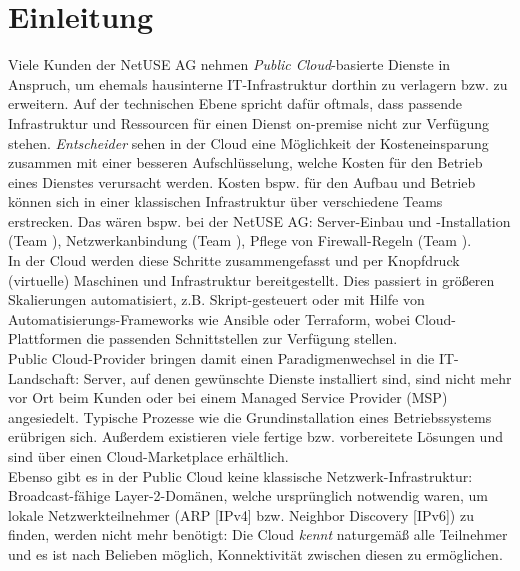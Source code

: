 \chapter{Einleitung}

Viele Kunden der NetUSE AG nehmen \textit{Public Cloud}-basierte Dienste in Anspruch, um ehemals hausinterne IT-Infrastruktur dorthin zu verlagern bzw. zu erweitern. Auf der technischen Ebene spricht dafür oftmals, dass passende Infrastruktur und Ressourcen für einen Dienst on-premise\cite{Karlstetter2017} nicht zur Verfügung stehen. \textit{Entscheider} sehen in der Cloud eine Möglichkeit der Kosteneinsparung zusammen mit einer besseren Aufschlüsselung, welche Kosten für den Betrieb eines Dienstes verursacht werden. Kosten bspw. für den Aufbau und Betrieb können sich in einer klassischen Infrastruktur über verschiedene Teams erstrecken. Das wären bspw. bei der NetUSE AG: Server-Einbau und -Installation (Team \grqq{}), Netzwerkanbindung (Team \grqq{}), Pflege von Firewall-Regeln (Team \grqq{}).\\
In der Cloud werden diese Schritte zusammengefasst und per Knopfdruck (virtuelle) Maschinen und Infrastruktur bereitgestellt\cite{Karlstetter2017a}. Dies passiert in größeren Skalierungen automatisiert, z.B. Skript-gesteuert oder mit Hilfe von Automatisierungs-Frameworks wie Ansible oder Terraform, wobei Cloud-Plattformen die passenden Schnittstellen zur Verfügung stellen\cite{edelman2018}\cite{Brikman2019}.\\
Public Cloud-Provider bringen damit einen Paradigmenwechsel in die IT-Landschaft: Server, auf denen gewünschte Dienste installiert sind, sind nicht mehr vor Ort beim Kunden oder bei einem Managed Service Provider (MSP)\cite{Laimingas2017} angesiedelt. Typische Prozesse wie die Grundinstallation eines Betriebssystems erübrigen sich. Außerdem existieren viele fertige bzw. vorbereitete Lösungen und sind über einen Cloud-Marketplace erhältlich.\\
Ebenso gibt es in der Public Cloud keine klassische Netzwerk-Infrastruktur: Broadcast-fähige Layer-2-Domänen, welche ursprünglich notwendig waren, um lokale Netzwerkteilnehmer (ARP [IPv4] bzw. Neighbor Discovery [IPv6]) zu finden, werden nicht mehr benötigt: Die Cloud \textit{kennt} naturgemäß alle Teilnehmer und es ist nach Belieben möglich, Konnektivität zwischen diesen zu ermöglichen.\\
